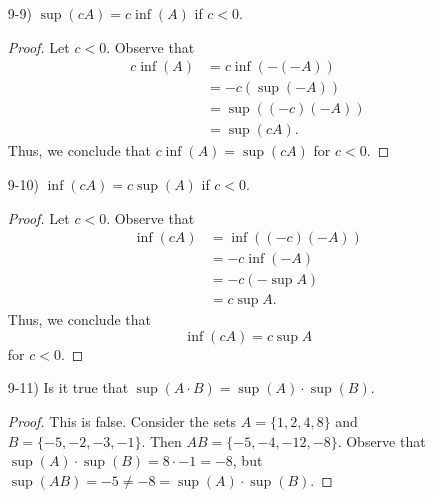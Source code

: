 \documentclass[11pt,a4paper]{article}
\begin{document}
\begin{enumerate}
\begin{enumerate}
\begin{proof}
            Note the fact that \( \inf(A) \) exists implies that there exists an \( \alpha \in A  \) such that  
            \[   \alpha < \inf(A) + \frac{ \epsilon }{ c } \]
            by the lemma found in {\hyperref[Problem 2]{Problem 2}}. Multiplying by \( c > 0  \), we have 
            \[  c \alpha < c \inf(A) + \epsilon \]
            for some \( c \alpha \in cA  \). Thus, we can set \( \gamma = c \alpha  \) and conclude that   
            \[  \inf(cA) = c \inf(A) \]
            by {\hyperref[Problem 2]{Problem 2}}.
            \end{proof}
        \item[9-9)] \( \sup(cA) = c \inf(A) \) if \( c < 0  \).
            \begin{proof}
            Let \( c < 0  \). Observe that 
            \begin{align*}
                c \inf(A) &= c \inf(- (-A))  \\
                          &= -c (\sup(-A)) \tag{9-4)}  \\
                          &= \sup((-c)(-A)) \tag{\( -c > 0  \) and 9-7)} \\
                          &= \sup(cA).
            \end{align*}
            Thus, we conclude that  \( c \inf(A) = \sup(cA) \) for \( c < 0  \).
            \end{proof}
        \item[9-10)] \( \inf(cA) = c \sup (A) \) if \( c < 0  \).
            \begin{proof}
            Let \( c  < 0  \). Observe that 
            \begin{align*}
                \inf (cA) &= \inf ((-c)(-A)) \tag{\( -c > 0 \)} \\
                          &= -c \inf(-A) \tag{9-8)} \\
                          &= -c (- \sup A ) \tag{9-4)} \\ 
                          &= c \sup A. 
            \end{align*}
            Thus, we conclude that 
            \[  \inf(cA) = c \sup A  \]
            for \( c < 0  \).
            \end{proof}
        \item[9-11)] Is it true that \( \sup(A \cdot B) = \sup(A) \cdot \sup(B) \).
            \begin{proof}
            This is false. Consider the sets \( A = \{ 1, 2, 4, 8  \}  \) and \( B = \{ -5,-2, -3 , -1 \}  \). Then \( AB = \{ -5, -4, -12, -8 \}  \). Observe that \( \sup(A) \cdot \sup(B) = 8 \cdot -1 = -8 \), but \( \sup(AB) = -5 \neq -8 = \sup(A) \cdot \sup(B)  \). 

\end{proof}
\end{enumerate}
\end{enumerate}
\end{document}
